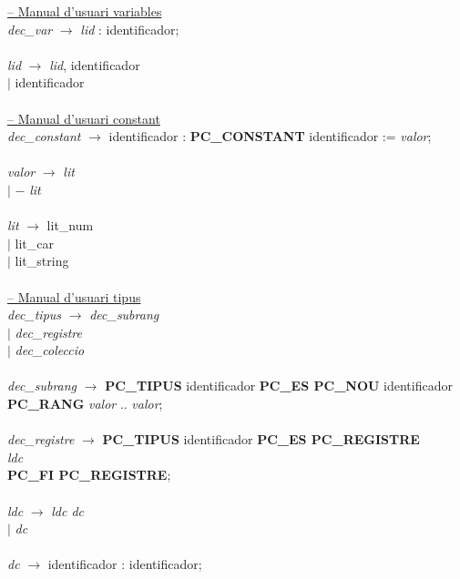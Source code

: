 \documentclass[10pt]{report}
\begin{document}
\begin{tabbing}
        \underline{-- Manual d'usuari variables} \\
        \textit{dec\_var} \> $\rightarrow$ \> \textit{lid} : identificador; \\
        \\
        \textit{lid} \> $\rightarrow$ \> \textit{lid}, identificador \\
        \> $\mid$ \> identificador \\
        \\
        
        \underline{-- Manual d'usuari constant} \\
        \textit{dec\_constant} \> $\rightarrow$ \> identificador : \textbf{PC\_CONSTANT} identificador := \textit{valor};  \\
        \\
        \textit{valor} \> $\rightarrow$ \> \textit{lit} \\
        \> $\mid$ \> $-$ \textit{lit} \\
        \\
        \textit{lit} \> $\rightarrow$ \> lit\_num \\
        \> $\mid$ \> lit\_car \\
        \> $\mid$ \> lit\_string \\
        \\
        
        \underline{-- Manual d'usuari tipus} \\
        \textit{dec\_tipus} \> $\rightarrow$ \> \textit{dec\_subrang}  \\
        \> $\mid$ \> \textit{dec\_registre} \\
        \> $\mid$ \> \textit{dec\_coleccio} \\
        \\
        \textit{dec\_subrang} \> $\rightarrow$ \> \textbf{PC\_TIPUS} identificador \textbf{PC\_ES PC\_NOU} identificador \textbf{PC\_RANG} \textit{valor} .. \textit{valor}; \\
        \\
        \textit{dec\_registre} \> $\rightarrow$ \> \textbf{PC\_TIPUS} identificador \textbf{PC\_ES PC\_REGISTRE} \\
        \> \> \> \textit{ldc} \\
        \> \> \textbf{PC\_FI PC\_REGISTRE}; \\
        \\
        \textit{ldc} \> $\rightarrow$ \> \textit{ldc dc} \\
        \> $\mid$ \> \textit{dc} \\
        \\
        \textit{dc} \> $\rightarrow$ \> identificador : identificador; \\
        \\
        

\end{tabbing}
\end{document}
